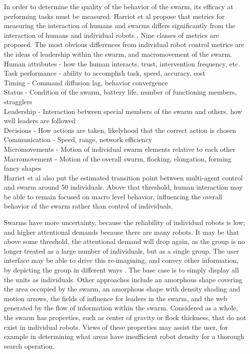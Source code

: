 \documentclass[]{article}
\begin{document}
In order to determine the quality of the behavior of the swarm, its efficacy at performing tasks must be measured. 
Harriot et al propose that metrics for measuring the interaction of humans and swarms differs significantly from the interaction of humans and individual robots \cite{harriott2014biologically}.
Nine classes of metrics are proposed. 
The most obvious differences from individual robot control metrics are the ideas of leadership within the swarm, and macromovement of the swarm. 
Human attributes - how the human interacts, trust, intervention frequency, etc. \\
Task performance - ability to accomplish task, speed, accuracy, cost \\
Timing - Command diffusion lag, behavior convergence \\
Status - Condition of the swarm, battery life, number of functioning members, stragglers \\
Leadership - Interaction between special members of the swarm and others, how well leaders are followed \\
Decisions - How actions are taken, likelyhood that the correct action is chosen \\
Communication - Speed, range, network efficiency \\
Micromovements - Motion of individual swarm elements relative to each other \\
Macromovement - Motion of the overall swarm, flocking, elongation, forming fancy shapes \\ 
Harriet et al also put the estimated transition point between multi-agent control and swarm around 50 individuals. 
Above that threshold, human interaction may be able to remain focused on macro level behavior, influencing the overall behavior of the swarm rather than control of individuals. 

Swarms have more uncertainty, because the reliability of individual robots is low; and higher attentional demands because there are many robots. 
It may be that above some threshold, the attentional demand will drop again, as the group is no longer treated as a large number of individuals, but as a single group. 
The user interface may be able to drive this re-imagining, and convey other information, by depicting the group in different ways \cite{manning2015heuristic}.
The base case is to simply display all the units as individuals. 
Other approaches include an amorphous shape covering the area occupied by the swarm, an amorphous shape with density shading and motion arrows, the fields of influence for leaders in the swarm, and the web generated by the flow of information within the swarm. 
Considered as a whole, the swarm has properties, such as center of gravity or flock thickness, that do not exist in individual robots. 
Views of these properties may assist the user, for example in determining what areas have insufficient robot density for a thorough search operation. 
\end{document}
